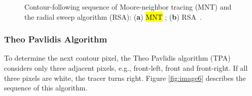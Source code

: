 \documentclass[sensors,article,accept,moreauthors,pdftex,10pt,a4paper]{mdpi}
\begin{document}
\begin{figure}[H]
	\centering
	\caption{Contour-following sequence of Moore-neighbor tracing (MNT) and the radial sweep algorithm (RSA): (\textbf{a}) \hl{MNT} \cite{Toussaint????Grids}; (\textbf{b}) RSA~\cite{Mirante1982Radial}.}
	\label{fig:mnt_rsa}
\end{figure}


\subsubsection{Theo Pavlidis Algorithm}
To determine the next contour pixel, the Theo Pavlidis algorithm (TPA) \cite{Pavlidis2012Algorithms} considers only three adjacent pixels, e.g., front-left, front and front-right. If all three pixels are white, the tracer turns right. Figure \ref{fig:image6} describes the sequence of this algorithm. 
\end{document}
